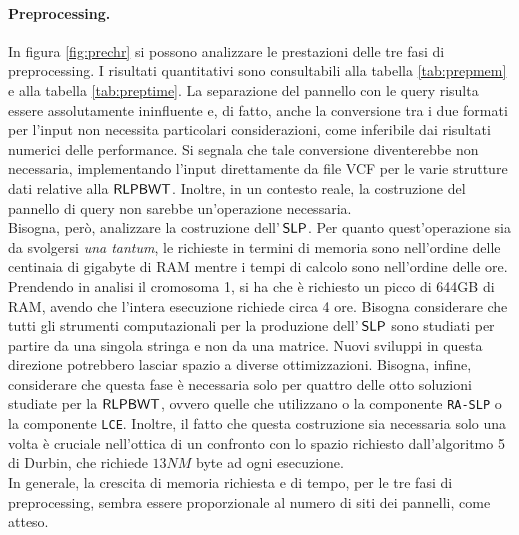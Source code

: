 \paragraph{Preprocessing.}
In figura \ref{fig:prechr} si possono analizzare le prestazioni delle tre
fasi di preprocessing. I risultati quantitativi sono consultabili alla tabella
\ref{tab:prepmem} e alla tabella \ref{tab:preptime}. La separazione del
pannello con le query risulta essere assolutamente 
ininfluente e, di fatto, anche la conversione tra i due formati per l'input non
necessita particolari considerazioni, come inferibile dai risultati numerici
delle performance. Si segnala che tale conversione 
diventerebbe non necessaria, implementando l'input direttamente da file VCF per
le varie strutture dati relative alla $\mbox{\rm {\sf RLPBWT}}$. Inoltre, in un contesto
reale, la costruzione del pannello di query non sarebbe un'operazione
necessaria.\\
Bisogna, però, analizzare la costruzione 
dell'$\,\mbox{\rm {\sf SLP}}$. Per quanto quest'operazione sia da svolgersi \textit{una
  tantum}, le richieste in termini di memoria sono nell'ordine delle centinaia
di gigabyte di RAM mentre i tempi di calcolo sono nell'ordine delle
ore. Prendendo in analisi il cromosoma 1, si ha che è richiesto un picco
di 644GB di RAM, avendo che l'intera esecuzione richiede circa 4 ore.
Bisogna considerare che tutti gli strumenti computazionali per la
produzione 
dell'$\,\mbox{\rm {\sf SLP}}$ sono studiati per partire da una singola stringa e non da una
matrice. Nuovi sviluppi in questa direzione potrebbero lasciar spazio a diverse
ottimizzazioni. Bisogna, infine, considerare che
questa fase è necessaria solo per quattro delle otto soluzioni studiate per la
$\mbox{\rm {\sf RLPBWT}}$, ovvero quelle che utilizzano o la componente \texttt{RA-SLP} o la
componente \texttt{LCE}. 
Inoltre, il fatto che questa costruzione sia necessaria solo una volta 
è cruciale nell'ottica di un confronto con
lo spazio richiesto dall'algoritmo 5 di Durbin, che richiede $13NM$
byte ad ogni esecuzione.\\
In generale, la crescita di memoria richiesta e di tempo, per le tre fasi di
preprocessing, sembra essere proporzionale al numero di siti dei pannelli, come
atteso.
